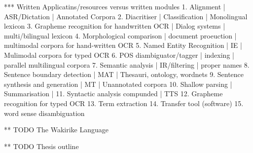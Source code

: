 *** Written Applicatins/resources versus written modules
1. Alignment | ASR/Dictation | Annotated Corpora
2. Diacritiser | Classification | Monolingual lexicon
3. Grapheme recognition for handwritten OCR | Dialog systems | multi/bilingual lexicon
4. Morphological comparison | document proeuction | multimodal corpora for hand-written OCR
5. Named Entity Recognition | IE | Mulimodal corpora for typed OCR
6. POS diambiguator/tagger | indexing | parallel multilingual corpora
7. Semantic analysis | IR/filtering | proper names
8. Sentence boundary detection | MAT | Thesauri, ontology, wordnets
9. Sentence synthesis and generation | MT | Unannotated corpora
10. Shallow parsing | Summarisation | 
11. Syntactic analysis compunded | TTS
12. Grapheme recognition for typed OCR
13. Term extraction
14. Transfer tool (software)
15. word sense disambiguation

** TODO The Wakirike Language

** TODO Thesis outline


